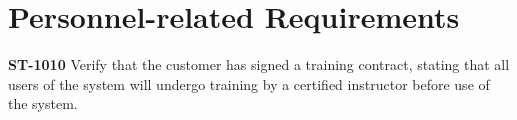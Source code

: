 \section{Personnel-related Requirements}

\textbf{ST-1010} Verify that the customer has signed a training contract, stating that all users of the system will undergo training by a certified instructor before use of the system. 